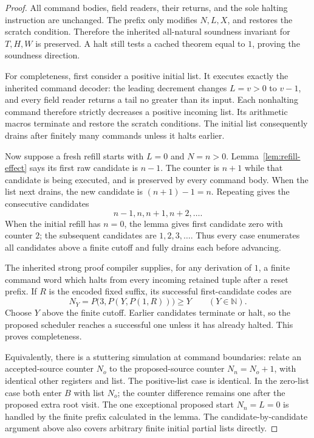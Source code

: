 \begin{proof}
All command bodies, field readers, their returns, and the sole halting
instruction are unchanged. The prefix only modifies $N,L,X$, and
restores the scratch condition. Therefore the inherited all-natural
soundness invariant for $T,H,W$ is preserved. A halt still tests a
cached theorem equal to $1$, proving the soundness direction.

For completeness, first consider a positive initial list. It executes
exactly the inherited command decoder: the leading decrement changes
$L=v>0$ to $v-1$, and every field reader returns a tail no greater than
its input. Each nonhalting command therefore strictly decreases a
positive incoming list. Its arithmetic macros terminate and restore
the scratch conditions. The initial list consequently drains after
finitely many commands unless it halts earlier.

Now suppose a fresh refill starts with $L=0$ and $N=n>0$.
Lemma~\ref{lem:refill-effect} says its first raw candidate is $n-1$.
The counter is $n+1$ while that candidate is being executed, and is
preserved by every command body. When the list next drains, the new
candidate is $(n+1)-1=n$. Repeating gives the consecutive candidates
\[
 n-1,n,n+1,n+2,\ldots.
\]
When the initial refill has $n=0$, the lemma gives first candidate zero
with counter $2$; the subsequent candidates are $1,2,3,\ldots$.
Thus every case enumerates all candidates above a finite cutoff and
fully drains each before advancing.

The inherited strong proof compiler supplies, for any derivation of
$1$, a finite command word which halts from every incoming retained
tuple after a reset prefix. If $R$ is the encoded fixed suffix, its
successful first-candidate codes are
\[
 N_Y=P\bigl(3,P(Y,P(1,R))\bigr)\geq Y\qquad(Y\in\mathbb N).
\]
Choose $Y$ above the finite cutoff. Earlier candidates terminate or
halt, so the proposed scheduler reaches a successful one unless it has
already halted. This proves completeness.

Equivalently, there is a stuttering simulation at command boundaries:
relate an accepted-source counter $N_o$ to the proposed-source counter
$N_n=N_o+1$, with identical other registers and list. The positive-list
case is identical. In the zero-list case both enter $B$ with list $N_o$;
the counter difference remains one after the proposed extra root visit.
The one exceptional proposed start $N_n=L=0$ is handled by the finite
prefix calculated in the lemma. The candidate-by-candidate argument
above also covers arbitrary finite initial partial lists directly.
\end{proof}

